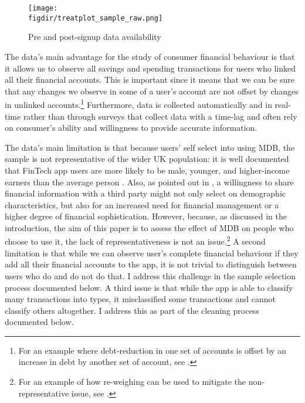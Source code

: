 \begin{figure}[h]
\centering
\caption{Pre and post-signup data availability}%
\texttt{[image: \\figdir/treatplot\_sample\_raw.png]}
\label{fig:treatplot}
\end{figure}

The data's main advantage for the study of consumer financial behaviour is that
it allows us to observe all savings and spending transactions for users who
linked all their financial accounts. This is important since it means that we
can be sure that any changes we observe in some of a user's account are not
offset by changes in unlinked accounts.\footnote{For an example where debt-reduction in
one set of accounts is offset by an increase in debt by another set of account,
see \citet{medina2021side}.} Furthermore, data is collected automatically and
in real-time rather than through surveys that collect data with a time-lag and
often rely on consumer's ability and willingness to provide accurate
information.

The data's main limitation is that because users' self select into using MDB,
the sample is not representative of the wider UK population: it is well
documented that FinTech app users are more likely to be male, younger, and
higher-income earners than the average person \citep{carlin2019generational}.
Also, as pointed out in \citet{gelman2014harnessing}, a willingness to share
financial information with a third party might not only select on demographic
characteristics, but also for an increased need for financial management or a
higher degree of financial sophistication. However, because, as discussed in
the introduction, the aim of this paper is to assess the effect of MDB on
people who choose to use it, the lack of representativeness is not an
issue.\footnote{For an example of how re-weighing can be used to mitigate the
non-representative issue, see \citet{bourquin2020effects}.} A second limitation
is that while we can observe user's complete financial behaviour if they add
all their financial accounts to the app, it is not trivial to distinguish
between users who do and do not do that. I address this challenge in the sample
selection process documented below. A third issue is that while the app is able
to classify many transactions into types, it misclassified some transactions
and cannot classify others altogether. I address this as part of the cleaning
process documented below.


